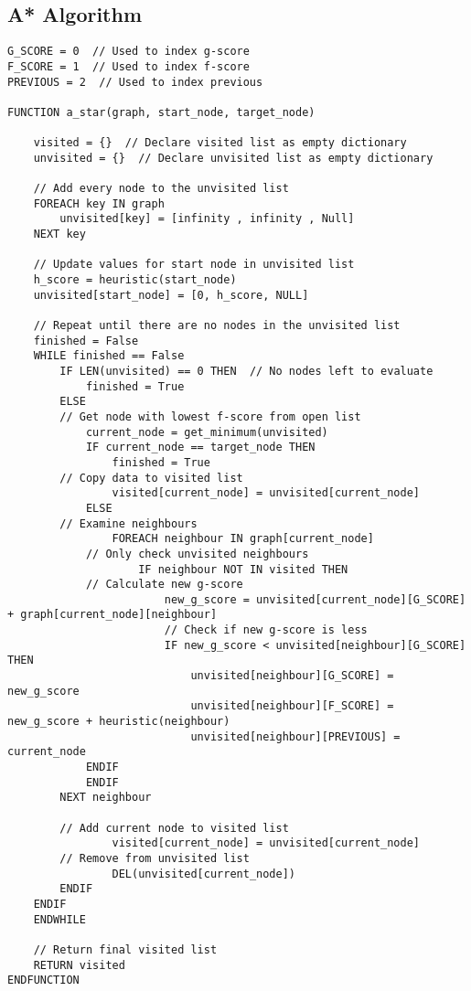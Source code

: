 \documentclass[a4paper,11pt]{article}
\begin{document}
\subsection{A* Algorithm}
\begin{Verbatim}[breaklines=true, breakanywhere=true]
G_SCORE = 0  // Used to index g-score
F_SCORE = 1  // Used to index f-score
PREVIOUS = 2  // Used to index previous

FUNCTION a_star(graph, start_node, target_node)
        
    visited = {}  // Declare visited list as empty dictionary    
    unvisited = {}  // Declare unvisited list as empty dictionary

    // Add every node to the unvisited list
    FOREACH key IN graph
        unvisited[key] = [infinity , infinity , Null] 
    NEXT key

    // Update values for start node in unvisited list
    h_score = heuristic(start_node)
    unvisited[start_node] = [0, h_score, NULL]  
    
    // Repeat until there are no nodes in the unvisited list
    finished = False
    WHILE finished == False
        IF LEN(unvisited) == 0 THEN  // No nodes left to evaluate
            finished = True 
        ELSE
	    // Get node with lowest f-score from open list
            current_node = get_minimum(unvisited) 
            IF current_node == target_node THEN
                finished = True
		// Copy data to visited list  
                visited[current_node] = unvisited[current_node]              
            ELSE
		// Examine neighbours
                FOREACH neighbour IN graph[current_node]
		    // Only check unvisited neighbours
                    IF neighbour NOT IN visited THEN
			// Calculate new g-score
                        new_g_score = unvisited[current_node][G_SCORE] + graph[current_node][neighbour]
                        // Check if new g-score is less						
                        IF new_g_score < unvisited[neighbour][G_SCORE] THEN
                            unvisited[neighbour][G_SCORE] = new_g_score
                            unvisited[neighbour][F_SCORE] = new_g_score + heuristic(neighbour)
                            unvisited[neighbour][PREVIOUS] = current_node
			ENDIF
		    ENDIF
		NEXT neighbour
                
		// Add current node to visited list
                visited[current_node] = unvisited[current_node]
		// Remove from unvisited list
                DEL(unvisited[current_node])
	    ENDIF
	ENDIF
    ENDWHILE
    
    // Return final visited list
    RETURN visited
ENDFUNCTION
\end{Verbatim}
\end{document}
